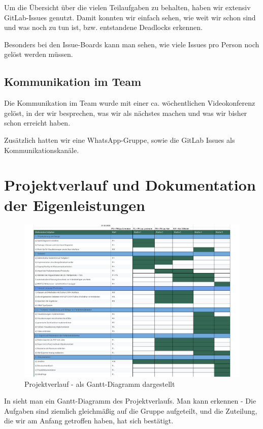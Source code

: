 \documentclass[ngerman]{article}
\begin{document}
    Um die Übersicht über die vielen Teilaufgaben zu behalten, haben wir extensiv GitLab-Issues genutzt.
    Damit konnten wir einfach sehen, wie weit wir schon sind und was noch zu tun ist, bzw. entstandene Deadlocks erkennen.

    Besonders bei den Issue-Boards kann man sehen, wie viele Issues pro Person noch gelöst werden müssen.

    \subsection{Kommunikation im Team}

    Die Kommunikation im Team wurde mit einer ca. wöchentlichen Videokonferenz gelöst, in der wir besprechen, was wir als nächstes machen und was wir bisher schon erreicht haben.

    Zusätzlich hatten wir eine WhatsApp-Gruppe, sowie die GitLab Issues als Kommunikationskanäle.

    \section{Projektverlauf und Dokumentation der Eigenleistungen}

    \begin{figure}
        \centering
        \includegraphics[width=\linewidth]{assets/gantt-diagramm.pdf}
        \caption{Projektverlauf - als Gantt-Diagramm dargestellt}
        \label{fig:gantt-dia}
    \end{figure}

    In  sieht man ein Gantt-Diagramm des Projektverlaufs.
    Man kann erkennen - Die Aufgaben sind ziemlich gleichmäßig auf die Gruppe aufgeteilt, und die Zuteilung, die wir am Anfang getroffen haben, hat sich bestätigt.
\end{document}
